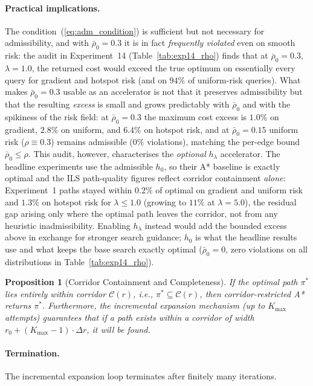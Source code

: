 \documentclass[preprint,12pt,authoryear]{elsarticle}
\newtheorem{proposition}{Proposition}
\begin{document}
\paragraph{Practical implications.}
The condition~(\ref{eq:adm_condition}) is sufficient but not necessary for admissibility, and with $\bar{\rho}_0 = 0.3$ it is in fact \emph{frequently violated} even on smooth risk: the audit in Experiment~14 (Table~\ref{tab:exp14_rho}) finds that at $\bar{\rho}_0 = 0.3$, $\lambda = 1.0$, the returned cost would exceed the true optimum on essentially every query for gradient and hotspot risk (and on $94\%$ of uniform-risk queries). What makes $\bar{\rho}_0 = 0.3$ usable as an accelerator is not that it preserves admissibility but that the resulting \emph{excess} is small and grows predictably with $\bar{\rho}_0$ and with the spikiness of the risk field: at $\bar{\rho}_0 = 0.3$ the maximum cost excess is $1.0\%$ on gradient, $2.8\%$ on uniform, and $6.4\%$ on hotspot risk, and at $\bar{\rho}_0 = 0.15$ uniform risk ($\rho \equiv 0.3$) remains admissible ($0\%$ violations), matching the per-edge bound $\bar{\rho}_0 \leq \rho$. This audit, however, characterises the \emph{optional} $h_\lambda$ accelerator. The headline experiments use the admissible $h_0$, so their A* baseline is exactly optimal and the ILS path-quality figures reflect corridor containment \emph{alone}: Experiment~1 paths stayed within $0.2\%$ of optimal on gradient and uniform risk and $1.3\%$ on hotspot risk for $\lambda \leq 1.0$ (growing to $11\%$ at $\lambda = 5.0$), the residual gap arising only where the optimal path leaves the corridor, not from any heuristic inadmissibility. Enabling $h_\lambda$ instead would add the bounded excess above in exchange for stronger search guidance; $h_0$ is what the headline results use and what keeps the base search exactly optimal ($\bar{\rho}_0 = 0$, zero violations on all distributions in Table~\ref{tab:exp14_rho}).

\begin{proposition}[Corridor Containment and Completeness]\label{prop:complete}
If the optimal path $\pi^*$ lies entirely within corridor $\mathcal{C}(r)$, i.e., $\pi^* \subseteq \mathcal{C}(r)$, then corridor-restricted A* returns $\pi^*$.
Furthermore, the incremental expansion mechanism (up to $K_{\max}$ attempts) guarantees that if a path exists within a corridor of width $r_0 + (K_{\max}-1) \cdot \Delta r$, it will be found.
\end{proposition}

\paragraph{Termination.}
The incremental expansion loop terminates after finitely many iterations.
\end{document}
